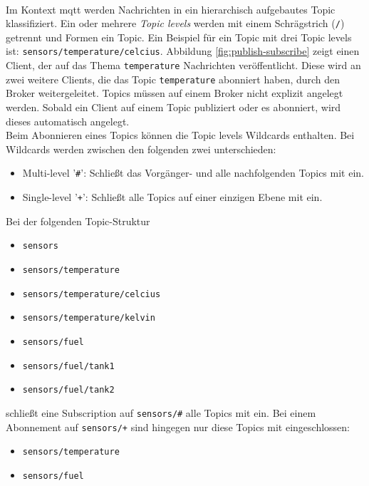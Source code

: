 \\
Im Kontext \ac{mqtt} werden Nachrichten in ein hierarchisch aufgebautes Topic klassifiziert.
Ein oder mehrere \textit{Topic levels} werden mit einem Schrägstrich (\verb|/|) getrennt und Formen ein Topic. Ein Beispiel für ein Topic mit drei Topic levels ist: \verb|sensors/temperature/celcius|.
Abbildung \ref{fig:publish-subscribe} zeigt einen Client, der auf das Thema \verb|temperature| Nachrichten veröffentlicht. Diese wird an zwei weitere Clients, die das Topic \verb|temperature| abonniert haben, durch den Broker weitergeleitet. Topics müssen auf einem Broker nicht explizit angelegt werden. Sobald ein Client auf einem Topic publiziert oder es abonniert, wird dieses automatisch angelegt.\cite{WhatMQTTDefinition}\\
Beim Abonnieren eines Topics können die Topic levels Wildcards enthalten. Bei Wildcards werden zwischen den folgenden zwei unterschieden:\cite{mqtt5Specification}
\begin{itemize}
    \item Multi-level '\verb|#|': Schlie{\ss}t das Vorgänger- und alle nachfolgenden Topics mit ein.
    \item Single-level '\verb|+|': Schlie{\ss}t alle Topics auf einer einzigen Ebene mit ein.
\end{itemize}
Bei der folgenden Topic-Struktur
\begin{itemize}
    \item \verb|sensors|
    \item \verb|sensors/temperature|
    \item \verb|sensors/temperature/celcius|
    \item \verb|sensors/temperature/kelvin|
    \item \verb|sensors/fuel|
    \item \verb|sensors/fuel/tank1|
    \item \verb|sensors/fuel/tank2|
\end{itemize}
schlie{\ss}t eine Subscription auf \verb|sensors/#| alle Topics mit ein. Bei einem Abonnement auf \verb|sensors/+| sind hingegen nur diese Topics mit eingeschlossen:
\begin{itemize}
    \item \verb|sensors/temperature|
    \item \verb|sensors/fuel|
\end{itemize}

